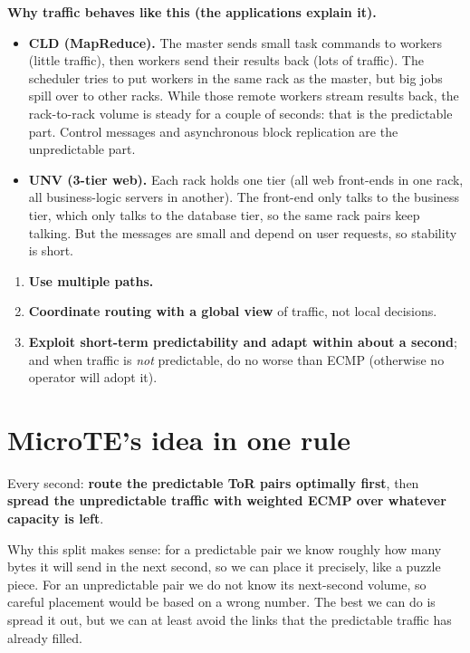 \textbf{Why traffic behaves like this (the applications explain it).}
\begin{itemize}
  \item \textbf{CLD (MapReduce).} The master sends small task commands to workers (little traffic), then workers send their results
        back (lots of traffic). The scheduler tries to put workers in the same rack as the master, but big jobs spill over to other racks.
        While those remote workers stream results back, the rack-to-rack volume is steady for a couple of seconds: that is the
        predictable part. Control messages and asynchronous block replication are the unpredictable part.
  \item \textbf{UNV (3-tier web).} Each rack holds one tier (all web front-ends in one rack, all business-logic servers in another). The
        front-end only talks to the business tier, which only talks to the database tier, so the same rack pairs keep talking. But the
        messages are small and depend on user requests, so stability is short.
\end{itemize}

\begin{keybox}
\begin{enumerate}
  \item \textbf{Use multiple paths.}
  \item \textbf{Coordinate routing with a global view} of traffic, not local decisions.
  \item \textbf{Exploit short-term predictability and adapt within about a second}; and when traffic is \emph{not} predictable, do
        no worse than ECMP (otherwise no operator will adopt it).
\end{enumerate}
\end{keybox}

\section{MicroTE's idea in one rule}

\begin{keybox}
Every second: \textbf{route the predictable ToR pairs optimally first}, then \textbf{spread the unpredictable traffic with weighted ECMP
over whatever capacity is left}.
\end{keybox}

Why this split makes sense: for a predictable pair we know roughly how many bytes it will send in the next second, so we can place it
precisely, like a puzzle piece. For an unpredictable pair we do not know its next-second volume, so careful placement would be based on a
wrong number. The best we can do is spread it out, but we can at least avoid the links that the predictable traffic has already filled.

